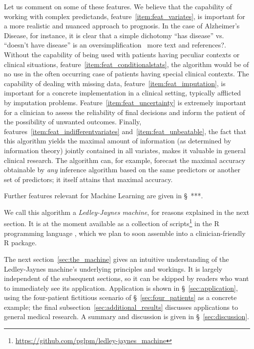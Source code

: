 \documentclass[utf8]{FrontiersinHarvard} %
\newcommand*{\pencil}{{\fontencoding{U}\fontfamily{fontawesometwo}\selectfont\symbol{210}}}
\newcommand{\mynotep}[1]{{\color{notecolour}\pencil\ #1}}
\newcommand*{\sect}{\S}%
\renewcommand*{\|}[1][]{\nonscript\:#1\vert\nonscript\:\mathopen{}}
\newcommand*{\ad}{Alzheimer's Disease}
\newcommand*{\ljm}{Ledley-Jaynes machine}
\begin{document}
Let us comment on some of these features. We believe that the capability of working with complex predictands, feature~\ref{item:feat_variates}, is important for a more realistic and nuanced approach to prognosis. In the case of \ad, for instance, it is clear that a simple dichotomy \enquote{has disease} vs. \enquote{doesn't have disease} is an oversimplification \mynotep{more text and references?}. Without the capability of being used with patients having peculiar contexts or clinical situations, feature~\ref{item:feat_conditionalstats}, the algorithm would be of no use in the often occurring case of patients having special clinical contexts. The capability of dealing with missing data, feature~\ref{item:feat_imputation}, is important for a concrete implementation in a clinical setting, typically afflicted by imputation problems. Feature~\ref{item:feat_uncertainty} is extremely important for a clinician to assess the reliability of final decisions and inform the patient of the possibility of unwanted outcomes. Finally, features~\ref{item:feat_indifferentvariates} and~\ref{item:feat_unbeatable}, the fact that this algorithm yields the maximal amount of information (as determined by information theory) jointly contained in all variates, makes it valuable in general clinical research. The algorithm can, for example, forecast the maximal accuracy obtainable by \emph{any} inference algorithm based on the same predictors or another set of predictors; it itself attains that maximal accuracy.

Further features relevant for Machine Learning are given in \sect\mynotep{***}.

We call this algorithm a \emph{\ljm}, for reasons explained in the next section. It is at the moment available as a collection of scripts\footnote{\url{https://github.com/pglpm/ledley-jaynes\_machine}} in the R programming language \citep{rcoreteam1995_r2023}, which we plan to soon assemble into a clinician-friendly R package.

The next section~\ref{sec:the_machine} gives an intuitive understanding of the \ljm's underlying principles and workings. It is largely independent of the subsequent sections, so it can be skipped by readers who want to immediately see its application. Application is shown in \sect~\ref{sec:application}, using the four-patient fictitious scenario of \sect~\ref{sec:four_patients} as a concrete example; the final subsection~\ref{sec:additional_results} discusses applications to general medical research. A summary and discussion is given in \sect~\ref{sec:discussion}.
\end{document}
